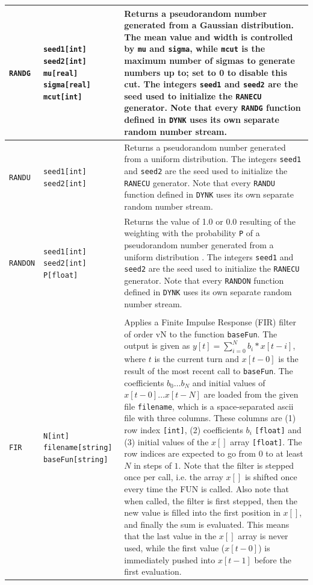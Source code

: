 \begin{center}
\begin{longtable}{|p{1.8cm} | p{4.1cm} | p{9.5cm}|}
    \texttt{RANDG} & \texttt{seed1[int] seed2[int] mu[real] sigma[real] mcut[int]} &
    Returns a pseudorandom number\index{random numbers} generated from a Gaussian distribution.
    The mean value and width is controlled by \texttt{mu} and \texttt{sigma}, while \texttt{mcut} is the maximum number of sigmas to generate numbers up to; set to 0 to disable this cut.
    The integers \texttt{seed1} and \texttt{seed2} are the seed used to initialize the \texttt{RANECU} generator.
    Note that every \texttt{RANDG} function defined in \texttt{DYNK} uses its own separate random number stream.\\*
    \hline

    \texttt{RANDU} & \texttt{seed1[int] seed2[int]} &
    Returns a pseudorandom number\index{random numbers} generated from a uniform distribution.
    The integers \texttt{seed1} and \texttt{seed2} are the seed used to initialize the \texttt{RANECU} generator.
    Note that every \texttt{RANDU} function defined in \texttt{DYNK} uses its own separate random number stream.\\*
    \hline

    \texttt{RANDON} & \texttt{seed1[int] seed2[int] P[float]} &
    Returns the value of 1.0 or 0.0 resulting of the weighting with the probability \texttt{P} of a pseudorandom number generated from a uniform distribution .
    The integers \texttt{seed1} and \texttt{seed2} are the seed used to initialize the \texttt{RANECU} generator.
    Note that every \texttt{RANDON} function defined in \texttt{DYNK} uses its own separate random number stream.\\
    \hline

    \rowcolor{blue!15}
    \multicolumn{3}{|l|}{Filters} \\*
    \hline

    \texttt{FIR} & \texttt{N[int] filename[string] baseFun[string]} &
    Applies a Finite Impulse Response\index{finite impulse response} (FIR) filter of order v{N} to the function \texttt{baseFun}.
    The output is given as $y[t] = \sum_{i=0}^N b_i*x[t-i]$, where $t$ is the current turn and $x[t-0]$ is the result of the most recent call to \texttt{baseFun}.
    The coefficients $b_0 \ldots b_N$ and initial values of $x[t-0]\ldots x[t-N]$ are loaded from the given file \texttt{filename}, which is a space-separated ascii file with three columns.
    These columns are (1) row index \texttt{[int]}, (2) coefficients $b_i$ \texttt{[float]} and (3) initial values of the $x[]$ array \texttt{[float]}.
    The row indices are expected to go from $0$ to at least $N$ in steps of $1$.
    Note that the filter is stepped once per call, i.e. the array $x[]$ is shifted once every time the FUN is called.
    Also note that when called, the filter is first stepped, then the new value is filled into the first position in $x[]$, and finally the sum is evaluated.
    This means that the last value in the $x[]$ array is never used, while the first value ($x[t-0]$) is immediately pushed into $x[t-1]$ before the first evaluation.\\*
    \hline


\end{longtable}
\end{center}
